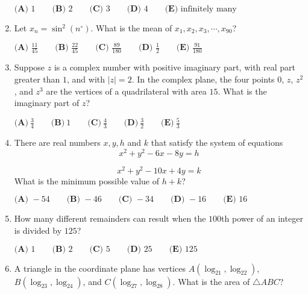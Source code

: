 \documentclass{article}
\begin{document}
\begin{enumerate}[label=\arabic*., itemsep=0.5em]
\(\textbf{(A) }1 \qquad\textbf{(B) }2 \qquad\textbf{(C) }3 \qquad\textbf{(D) }4 \qquad\textbf{(E) }\text{infinitely many}\qquad\)\par \vspace{0.5em}\item Let \(x_{n} = \sin^2(n^\circ)\). What is the mean of \(x_{1}, x_{2}, x_{3}, \cdots, x_{90}\)?

\(
\textbf{(A) }\frac{11}{45} \qquad
\textbf{(B) }\frac{22}{45} \qquad
\textbf{(C) }\frac{89}{180} \qquad
\textbf{(D) }\frac{1}{2} \qquad
\textbf{(E) }\frac{91}{180} \qquad
\)\par \vspace{0.5em}\item Suppose \(z\) is a complex number with positive imaginary part, with real part greater than \(1\), and with \(|z| = 2\). In the complex plane, the four points \(0\), \(z\), \(z^{2}\), and \(z^{3}\) are the vertices of a quadrilateral with area \(15\). What is the imaginary part of \(z\)?

\(\textbf{(A)}~\frac{3}{4}\qquad\textbf{(B)}~1\qquad\textbf{(C)}~\frac{4}{3}\qquad\textbf{(D)}~\frac{3}{2}\qquad\textbf{(E)}~\frac{5}{3}\)\par \vspace{0.5em}\item There are real numbers \(x,y,h\) and \(k\) that satisfy the system of equations
\begin{equation*}
x^2 + y^2 - 6x - 8y = h
\end{equation*}

\begin{equation*}
x^2 + y^2 - 10x + 4y = k
\end{equation*}
What is the minimum possible value of \(h+k\)?

\(
\textbf{(A) }-54 \qquad
\textbf{(B) }-46 \qquad
\textbf{(C) }-34 \qquad
\textbf{(D) }-16 \qquad
\textbf{(E) }16 \qquad
\)\par \vspace{0.5em}\item How many different remainders can result when the \(100\)th power of an integer is divided by \(125\)?

\(\textbf{(A) }1 \qquad\textbf{(B) }2 \qquad\textbf{(C) }5 \qquad\textbf{(D) }25 \qquad\textbf{(E) }125 \qquad\)\par \vspace{0.5em}\item A triangle in the coordinate plane has vertices \(A(\log_21,\log_22)\), \(B(\log_23,\log_24)\), and \(C(\log_27,\log_28)\). What is the area of \(\triangle ABC\)?


\end{enumerate}
\end{document}
